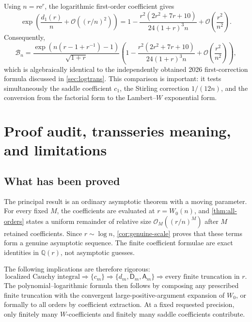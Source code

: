 \documentclass[11pt,a4paper]{article}
\theoremstyle{definition}
\theoremstyle{remark}
\newcommand{\Bell}{\mathcal B}
\newcommand{\Q}{\mathbb Q}
\newcommand{\ee}{\mathrm e}
\newcommand{\BigO}{\mathcal O}
\newcommand{\cA}{\mathsf A}
\newcommand{\cD}{\mathsf D}
\begin{document}
Using \(n=r\ee^r\), the logarithmic first-order coefficient gives
\begin{equation}\label{eq:first-check-expanded}
 \exp\!\left(\frac{d_1(r)}{n}+\BigO((r/n)^2)\right)
 =1-
 \frac{r^2(2r^2+7r+10)}{24(1+r)^3n}
 +\BigO\!\left(\frac{r^2}{n^2}\right).
\end{equation}
Consequently,
\begin{equation}\label{eq:first-check-final}
 \Bell_n=
 \frac{\exp\!\left(n(r-1+r^{-1})-1\right)}{\sqrt{1+r}}
 \left(
 1-
 \frac{r^2(2r^2+7r+10)}{24(1+r)^3n}
 +\BigO\!\left(\frac{r^2}{n^2}\right)
 \right),
\end{equation}
which is algebraically identical to the independently obtained 2026
first-correction formula discussed in \cref{sec:logtrans}.  This comparison is
important: it tests simultaneously the saddle coefficient \(c_1\), the
Stirling correction \(1/(12n)\), and the conversion from the factorial form to
the Lambert--\(W\) exponential form.

\section{Proof audit, transseries meaning, and limitations}\label{sec:audit}

\subsection{What has been proved}

The principal result is an ordinary asymptotic theorem with a moving
parameter.  For every fixed \(M\), the coefficients are evaluated at
\(r=W_0(n)\), and \cref{thm:all-orders} states a uniform remainder of relative
size \(\BigO_M((r/n)^M)\) after \(M\) retained coefficients.  Since
\(r\sim\log n\), \cref{cor:genuine-scale} proves that these terms form a
genuine asymptotic sequence.  The finite coefficient formulae are exact
identities in \(\Q(r)\), not asymptotic guesses.

The following implications are therefore rigorous:
\begin{equation}\label{eq:rigorous-implications}
 \text{localized Cauchy integral}
 \Longrightarrow \{c_m\}
 \Longrightarrow \{d_m,\cD_m,\cA_m\}
 \Longrightarrow \text{every finite truncation in }r.
\end{equation}
The polynomial--logarithmic formula then follows by composing any prescribed
finite truncation with the convergent large-positive-argument expansion of
\(W_0\), or formally to all orders by coefficient extraction.  At a fixed
requested precision, only finitely many \(W\)-coefficients and finitely many
saddle coefficients contribute.
\end{document}
